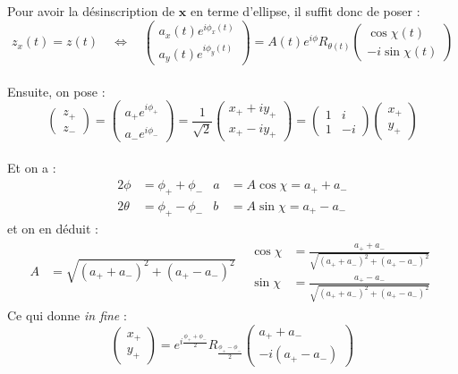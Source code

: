 \documentclass[hidelinks, french, oneside]{article}
\newcommand{\Llr}{\Longleftrightarrow}
\renewcommand{\bf}[1]{\boldsymbol{#1}}
\theoremstyle{enonce}
\theoremstyle{special}
\theoremstyle{rqlike}
\theoremstyle{exo}
\theoremstyle{demo}
\begin{document}
Pour avoir la désinscription de $\bf{x}$ en terme d’ellipse, il suffit donc de poser :
\[z_x(t) = z(t)\quad \Llr\quad \begin{pmatrix}a_x(t) e^{i\phi_x(t)} \\ a_y(t) e^ {i\phi_y(t)}\end{pmatrix} = A(t)e^{i\phi} R_{\theta(t)} \begin{pmatrix} \cos\chi(t) \\ -i\sin\chi(t) \end{pmatrix}\]
\\
Ensuite, on pose :
\[\begin{pmatrix}z_+ \\ z_-\end{pmatrix} = \begin{pmatrix}a_+ e^{i\phi_+} \\ a_- e^{i\phi_-}\end{pmatrix} = \frac{1}{\sqrt{2}}\begin{pmatrix}x_+ + iy_+ \\ x_+ - iy_+\end{pmatrix} = \begin{pmatrix}1 & i \\ 1 & -i\end{pmatrix} \begin{pmatrix}x_+ \\ y_+\end{pmatrix}\]
\\
Et on a :
\begin{align*}
	2\phi &= \phi_+ + \phi_-  &  a &= A\cos\chi = a_+ + a_- \\
	2\theta &= \phi_+ - \phi_-  &  b &= A\sin\chi = a_+ - a_- 
\end{align*}
et on en déduit :
\begin{align*}
	A &= \sqrt{(a_+ + a_-)^2 + (a_+ - a_-)^2}  &  \begin{aligned} \cos\chi &= \frac{a_+ + a_- }{\sqrt{(a_+ + a_-)^2 + (a_+ - a_-)^2}}  \\  \sin\chi &= \frac{a_+ - a_- }{\sqrt{(a_+ + a_-)^2 + (a_+ - a_-)^2}}	\end{aligned}
\end{align*}
Ce qui donne \textit{in fine} :
\[\begin{pmatrix}x_+ \\ y_+\end{pmatrix} = e^{i\frac{\phi_+ + \phi_-}{2}} R_{\frac{\phi_+ - \phi_-}{2}} \begin{pmatrix}a_+ + a_- \\ -i(a_+ - a_-)\end{pmatrix}\]
\\
\end{document}
